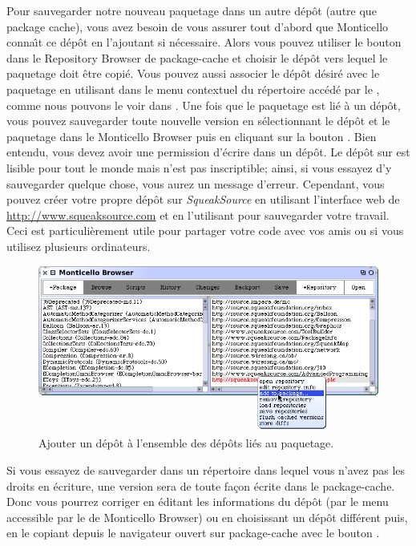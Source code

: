 \documentclass[a4paper,10pt,twoside]{book}
\begin{document}
Pour sauvegarder notre nouveau paquetage dans un autre
d\'ep\^ot (autre que package cache), vous
avez besoin de vous assurer tout d'abord que Monticello conna\^{\i}t
ce d\'ep\^ot en l'ajoutant si n\'ecessaire.
Alors vous pouvez utiliser le bouton  dans le 
Repository Browser de package-cache et choisir le d\'ep\^ot vers lequel
le paquetage doit \^etre copi\'e.
Vous pouvez aussi associer le d\'ep\^ot d\'esir\'e avec le paquetage
en utilisant  
dans le menu contextuel du r\'epertoire acc\'ed\'e par le , comme
nous pouvons le voir dans .
Une fois que le paquetage est li\'e \`a un d\'ep\^ot, vous pouvez sauvegarder
toute nouvelle version en s\'electionnant le d\'ep\^ot et le paquetage
dans le Monticello Browser puis en cliquant sur la bouton 
 .  
Bien entendu, vous devez avoir une permission d'\'ecrire dans un d\'ep\^ot.
Le d\'ep\^ot  sur  est
lisible pour tout le monde mais n'est pas inscriptible; ainsi, si vous
essayez d'y sauvegarder quelque chose, vous aurez un message d'erreur.
Cependant, vous pouvez cr\'eer votre propre d\'ep\^ot sur 
\emph{SqueakSource} en utilisant l'interface web de \url{http://www.squeaksource.com} et en l'utilisant pour sauvegarder votre travail.
Ceci est particuli\`erement utile pour partager votre code avec vos amis ou
si vous utilisez plusieurs ordinateurs.

\begin{figure}[tbp]
	\begin{center}
		\includegraphics[width=\textwidth]{MCaddToPackage}
	\end{center}
	\caption{Ajouter un d\'ep\^ot \`a l'ensemble des d\'ep\^ots li\'es
au paquetage.}
	\label{fig:associateRepository}
\end{figure}

Si vous essayez de sauvegarder dans un r\'epertoire dans lequel vous n'avez
pas les droits en \'ecriture, une version sera de toute fa\c{c}on \'ecrite
dans le package-cache.
Donc vous pourrez corriger en \'editant les informations du d\'ep\^ot
(par le menu accessible par le  de Monticello Browser) ou
en choisissant un d\'ep\^ot diff\'erent puis, en le copiant
depuis le navigateur ouvert sur package-cache avec le bouton .
\end{document}
